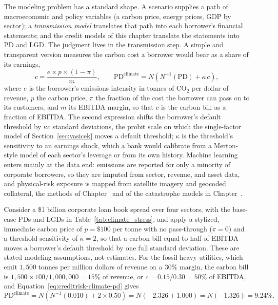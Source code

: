 \documentclass[../ai_in_finance]{subfiles}
\begin{document}
The modeling problem has a standard shape. A scenario supplies a path of macroeconomic and policy variables (a carbon price, energy prices, GDP by sector); a \emph{transmission model} translates that path into each borrower's financial statements; and the credit models of this chapter translate the statements into PD and LGD. The judgment lives in the transmission step. A simple and transparent version measures the carbon cost a borrower would bear as a share of its earnings,
\begin{equation}
\label{eq:creditrisk-climate-pd}
c = \frac{e \times p \times (1-\pi)}{m}, \qquad \text{PD}^{\text{climate}} = N\!\left(N^{-1}(\text{PD}) + \kappa\, c\right),
\end{equation}
where $e$ is the borrower's emissions intensity in tonnes of CO$_2$ per dollar of revenue, $p$ the carbon price, $\pi$ the fraction of the cost the borrower can pass on to its customers, and $m$ its EBITDA margin, so that $c$ is the carbon bill as a fraction of EBITDA. The second expression shifts the borrower's default threshold by $\kappa c$ standard deviations, the probit scale on which the single-factor model of Section~\ref{sec:vasicek} moves a default threshold; $\kappa$ is the threshold's sensitivity to an earnings shock, which a bank would calibrate from a Merton-style model of each sector's leverage or from its own history. Machine learning enters mainly at the data end: emissions are reported for only a minority of corporate borrowers, so they are imputed from sector, revenue, and asset data, and physical-risk exposure is mapped from satellite imagery and geocoded collateral, the methods of Chapter~ and of the catastrophe models in Chapter~.


Consider a \$1 billion corporate loan book spread over four sectors, with the base-case PDs and LGDs in Table~\ref{tab:climate_stress}, and apply a stylized, immediate carbon price of $p=\$100$ per tonne with no pass-through ($\pi=0$) and a threshold sensitivity of $\kappa=2$, so that a carbon bill equal to half of EBITDA moves a borrower's default threshold by one full standard deviation. These are stated modeling assumptions, not estimates. For the fossil-heavy utilities, which emit $1{,}500$ tonnes per million dollars of revenue on a $30\%$ margin, the carbon bill is $1{,}500 \times 100 / 1{,}000{,}000 = 15\%$ of revenue, or $c = 0.15/0.30 = 50\%$ of EBITDA, and Equation~\eqref{eq:creditrisk-climate-pd} gives
\begin{equation*}
\text{PD}^{\text{climate}} = N\!\left(N^{-1}(0.010) + 2 \times 0.50\right) = N(-2.326 + 1.000) = N(-1.326) = 9.24\%.
\end{equation*}
\end{document}
